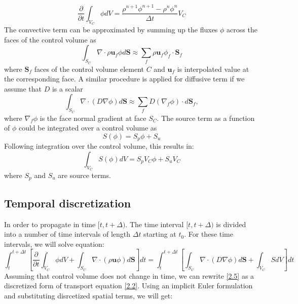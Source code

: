 \begin{equation}
    \frac{\partial}{\partial t}\int_{V_C} \phi d V = \frac{ \rho^{n+1} \phi^{n+1} -  \rho^{n}\phi^{n} }{\Delta t} V_C
\end{equation}
The convective term can be approximated by summing up the fluxes $\phi$ across the faces of the control volume as
\begin{equation}
    \int_{S_C}\nabla \cdot \rho\mathbf{u}_f \phi d \mathbf{S} \approx \sum_f  \rho\mathbf{u}_f \phi_f\cdot \mathbf{S}_f
\end{equation}
where $\mathbf{S}_f$ faces of the control volume element $C$ and $\mathbf{u}_{f}$ is interpolated value at the corresponding face.
A similar procedure is applied for diffusive term if we assume that $D$ is a scalar
\begin{equation}
    \int_{S_C}\nabla\cdot(D \nabla \phi) d \mathbf{S} \approx \sum_f D (\nabla_f \phi)\cdot{d\mathbf{S}_f},
\end{equation}
where $ \nabla_f \phi$ is the face normal gradient at face $S_C$. The source term as a function of $\phi$ could be integrated over a control volume as
\begin{equation}
  S(\phi) = S_p\phi +S_u
  \end{equation}
Following integration over the control volume, this results in:
  \begin{equation}
\int_{V_C} S(\phi) d V  = S_p V_C\phi +S_u V_C
\end{equation}
where $S_p$ and $S_u$ are source terms.

\subsection{Temporal discretization}
In order to propagate in time $[t, t+\Delta)$. The time interval $[t, t+\Delta)$ is divided into a number of time intervals of length $\Delta t$ starting at $t_0$. For these time intervals, we will solve equation:
\begin{equation}\label{2.5}
\int^{t+\Delta t}_t \left[\frac{\partial}{\partial t}\int_{V_C} \phi d V+\int_{S_C} \nabla \cdot(\rho \mathbf{u}\phi) d \mathbf{S}\right] d t=\int^{t+\Delta t}_t\left[\int_{S_C} \nabla \cdot(D \nabla \phi) d \mathbf{S} + \int_{V_C} S d V\right] d t
\end{equation}
Assuming that control volume does not change in time, we can rewrite \ref{2.5} as a discretized form of transport equation \ref{2.2}. Using an implicit Euler formulation and substituting disrcetized spatial terms, we will get:

